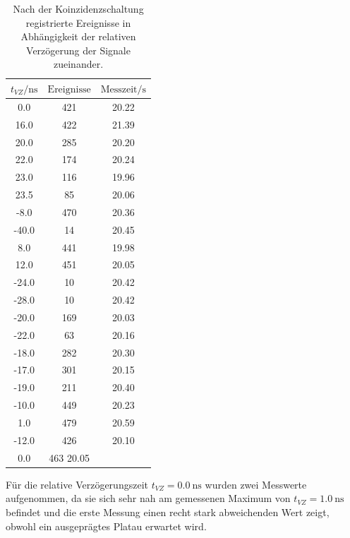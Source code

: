 \begin{table}
  \caption{Nach der Koinzidenzschaltung registrierte Ereignisse in Abhängigkeit der relativen Verzögerung der Signale zueinander.}
  \label{tab:koinzidenz}
  \centering
  \begin{tabular}{|S|S|S|}
    \toprule
    $t_{VZ}/\si{\nano\second}$ & $\text{Ereignisse}$ & $\text{Messzeit}/\si{\second}$ \\
     & 421 & 20.22 \\
    16.0 & 422 & 21.39  \\
    20.0 & 285 & 20.20 \\
    22.0 & 174 & 20.24 \\
    23.0 & 116 & 19.96 \\
    23.5 & 85 & 20.06 \\
    -8.0 & 470 & 20.36 \\
    -40.0 & 14 & 20.45 \\
    8.0 & 441 & 19.98 \\
    12.0 & 451 & 20.05 \\
    -24.0 & 10  & 20.42 \\
    -28.0 & 10 & 20.42 \\
    -20.0 & 169 & 20.03 \\
    -22.0 & 63 & 20.16 \\
    -18.0 & 282 &20.30 \\
    -17.0 & 301 & 20.15 \\
    -19.0 & 211 & 20.40 \\
    -10.0 & 449 & 20.23 \\
    1.0 & 479 & 20.59 \\
    -12.0 & 426 & 20.10 \\
    0.0 & 463 20.05 \\
    \bottomrule
  \end{tabular}
\end{table}

Für die relative Verzögerungszeit $t_{VZ}= \SI{0.0}{\nano\second}$ wurden zwei Messwerte aufgenommen, da sie sich sehr nah am gemessenen Maximum von $t_{VZ}= \SI{1.0}{\nano\second}$ befindet und die erste Messung einen recht stark abweichenden Wert zeigt, obwohl ein ausgeprägtes Platau erwartet wird.

